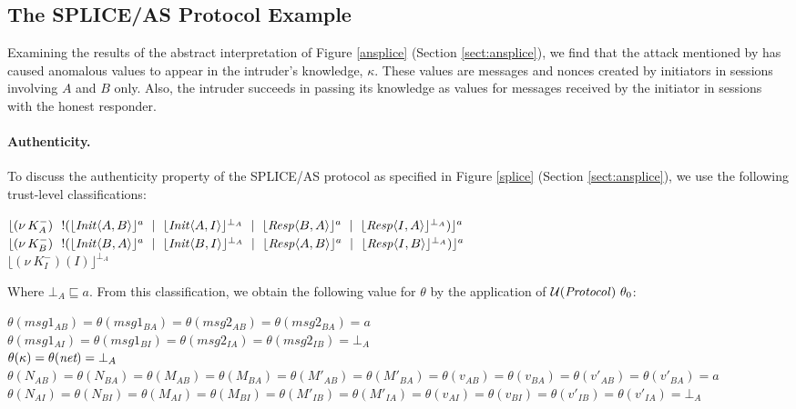 \documentclass[10pt,a4paper,final,oneside,fleqn]{book}
\begin{document}
\subsection{The SPLICE/AS Protocol Example}
Examining the results of the abstract interpretation of Figure \ref{ansplice} (Section \ref{sect:ansplice}), we find that the attack mentioned by \cite{clark1} has caused anomalous values to appear in the intruder's knowledge, $\kappa$.  These values are messages and nonces created by initiators in sessions involving $A$ and $B$ only.  Also, the intruder succeeds in passing its knowledge as values for messages received by the initiator in sessions with the honest responder.

\paragraph{Authenticity.} To discuss the authenticity property of the SPLICE/AS protocol as specified in Figure \ref{splice} (Section \ref{sect:ansplice}), we use the following trust-level classifications:\vspace{3mm}

\noindent
$\lfloor (\nu~\!K^-_{A})~~!(\lfloor \mbox{{\itshape Init\/}}\langle A,B\rangle\rfloor^a~\mid~\lfloor \mbox{{\itshape Init\/}}\langle A,I\rangle\rfloor^{\bot_A}~\mid~\lfloor \mbox{{\itshape Resp\/}}\langle B,A\rangle\rfloor^{a}~\mid~\lfloor \mbox{{\itshape Resp\/}}\langle I,A\rangle\rfloor^{\bot_A})\rfloor^a$\\
$\lfloor (\nu~\!K^-_{B})~~!(\lfloor \mbox{{\itshape Init\/}}\langle B,A\rangle\rfloor^a~\mid~\lfloor \mbox{{\itshape Init\/}}\langle B,I\rangle\rfloor^{\bot_A}~\mid~\lfloor \mbox{{\itshape Resp\/}}\langle A,B\rangle\rfloor^a~\mid~\lfloor \mbox{{\itshape Resp\/}}\langle I,B\rangle\rfloor^{\bot_A})\rfloor^a$\\
$\lfloor (\nu~\!K^-_I)(I)\rfloor^{\bot_A}$\vspace{3mm}

\noindent
Where $\bot_A\sqsubseteq a$. From this classification, we obtain the following value for $\theta$ by the application of $\mathcal{U}(\mbox{{\itshape Protocol\/}})~\theta_0$:\vspace{4mm}

\noindent $\theta(msg1_{AB})=\theta(msg1_{BA})=\theta(msg2_{AB})=\theta(msg2_{BA})=a$\\
$\theta(msg1_{AI})=\theta(msg1_{BI})=\theta(msg2_{IA})=\theta(msg2_{IB})=\bot_A$\\
$\theta(\kappa)=\theta(\mbox{{\itshape net}})=\bot_A$\\
$\theta(N_{AB})=\theta(N_{BA})=\theta(M_{AB})=\theta(M_{BA})=\theta(M'_{AB})=\theta(M'_{BA})=\theta(v_{AB})=\theta(v_{BA})=\theta(v'_{AB})=\theta(v'_{BA})=a$\\
$\theta(N_{AI})=\theta(N_{BI})=\theta(M_{AI})=\theta(M_{BI})=\theta(M'_{IB})=\theta(M'_{IA})=\theta(v_{AI})=\theta(v_{BI})=\theta(v'_{IB})=\theta(v'_{IA})=\bot_A$
\end{document}

